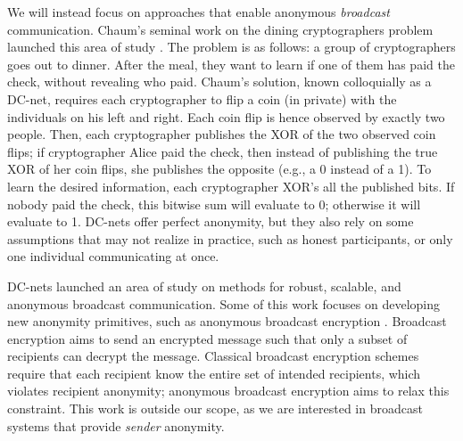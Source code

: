 \documentclass[10pt, twocolumn]{article}
\begin{document}
We will instead focus on approaches that enable anonymous \emph{broadcast} communication.
Chaum's seminal work on the dining cryptographers problem launched this area of study \cite{chaum88}.
The problem is as follows: a group of cryptographers goes out to dinner. After the meal, they want to learn if one of them has paid the check, without revealing who paid.
Chaum's solution, known colloquially as a DC-net, requires each cryptographer to flip a coin (in private) with the individuals on his left and right. Each coin flip is hence observed by exactly two people.
Then, each cryptographer publishes the XOR of the two observed coin flips; if cryptographer Alice paid the check, then instead of publishing the true XOR of her coin flips, she publishes the opposite (e.g., a 0 instead of a 1).
To learn the desired information, each cryptographer XOR's all the published bits. If nobody paid the check, this bitwise sum will evaluate to 0; otherwise it will evaluate to 1.
DC-nets offer perfect anonymity, but they also rely on some assumptions that may not realize in practice, such as honest participants, or only one individual communicating at once.

DC-nets launched an area of study on methods for robust, scalable, and anonymous broadcast communication. 
Some of this work focuses on developing new anonymity primitives, such as anonymous broadcast encryption \cite{libert2012anonymous, fazio2012outsider}.
Broadcast encryption aims to send an encrypted message such that only a subset of recipients can decrypt the message.
Classical broadcast encryption schemes require that each recipient know the entire set of intended recipients, which violates recipient anonymity; anonymous broadcast encryption aims to relax this constraint. 
This work is outside our scope, as we are interested in broadcast systems that provide \emph{sender} anonymity.
\end{document}
